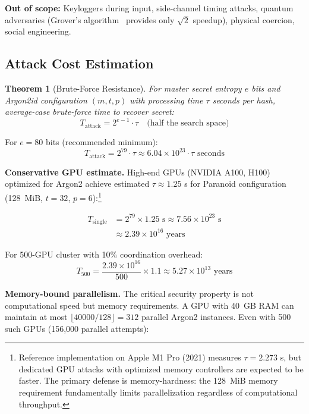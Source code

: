 \documentclass[11pt]{article}
\newtheorem{theorem}{Theorem}
\begin{document}
\textbf{Out of scope:} Keyloggers during input, side-channel timing attacks, quantum adversaries (Grover's algorithm~\cite{grover1996} provides only $\sqrt{2}$ speedup), physical coercion, social engineering.

\subsection{Attack Cost Estimation}

\begin{theorem}[Brute-Force Resistance]
\label{thm:bruteforce}
For master secret entropy $e$ bits and Argon2id configuration $(m, t, p)$ with processing time $\tau$ seconds per hash, average-case brute-force time to recover secret:
\begin{equation}
T_{\text{attack}} = 2^{e-1} \cdot \tau \quad \text{(half the search space)}
\end{equation}
\end{theorem}

For $e = 80$ bits (recommended minimum):
\begin{equation}
T_{\text{attack}} = 2^{79} \cdot \tau \approx 6.04 \times 10^{23} \cdot \tau \text{ seconds}
\end{equation}

\textbf{Conservative GPU estimate.} High-end GPUs (NVIDIA A100, H100) optimized for Argon2 achieve estimated $\tau \approx 1.25$ s for Paranoid configuration (128~MiB, $t=32$, $p=6$):\footnote{Reference implementation on Apple M1 Pro (2021) measures $\tau = 2.273$ s, but dedicated GPU attacks with optimized memory controllers are expected to be faster. The primary defense is memory-hardness: the 128~MiB memory requirement fundamentally limits parallelization regardless of computational throughput.}

\begin{align}
T_{\text{single}} &= 2^{79} \times 1.25 \text{ s} \approx 7.56 \times 10^{23} \text{ s} \\
&\approx 2.39 \times 10^{16} \text{ years}
\end{align}

For 500-GPU cluster with 10\% coordination overhead:
\begin{equation}
T_{500} = \frac{2.39 \times 10^{16}}{500} \times 1.1 \approx 5.27 \times 10^{13} \text{ years}
\end{equation}

\textbf{Memory-bound parallelism.} The critical security property is not computational speed but memory requirements. A GPU with 40~GB RAM can maintain at most $\lfloor 40000 / 128 \rfloor = 312$ parallel Argon2 instances. Even with 500 such GPUs (156,000 parallel attempts):
\end{document}
